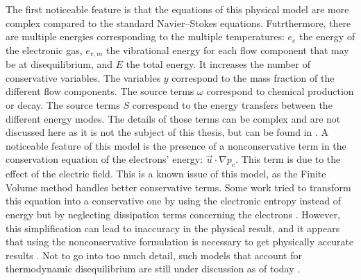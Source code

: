       The first noticeable feature is that the equations of this physical model are more complex compared to the standard Navier--Stokes equations.
      Futrthermore, there are multiple energies corresponding to the multiple temperatures: $e_e$ the energy of the electronic gas, $e_{v, m}$ the vibrational energy for each flow component that may be at disequilibrium, and $E$ the total energy.
      It increases the number of conservative variables.
      The variables $y$ correspond to the mass fraction of the different flow components.
      The source terms $\omega$ correspond to chemical production or decay.
      The source terms $S$ correspond to the energy transfers between the different energy modes.
      The details of those terms can be complex and are not discussed here as it is not the subject of this thesis, but can be found in \cite{Soubrie2006}.
      A noticeable feature of this model is the presence of a nonconservative term in the conservation equation of the electrons' energy: $\vec{u} \cdot \nabla p_e$.
      This term is due to the effect of the electric field.
      This is a known issue of this model, as the Finite Volume method handles better conservative terms.
      Some work tried to transform this equation into a conservative one by using the electronic entropy instead of energy but by neglecting dissipation terms concerning the electrons \cite{CoquelMarmignon1995}.
      However, this simplification can lead to inaccuracy in the physical result, and it appears that using the nonconservative formulation is necessary to get physically accurate results \cite{Soubrie2006, KimGuelhanBoyd2012}.
      Not to go into too much detail, such models that account for thermodynamic disequilibrium are still under discussion as of today \cite{BlancoJosyula2020}.

